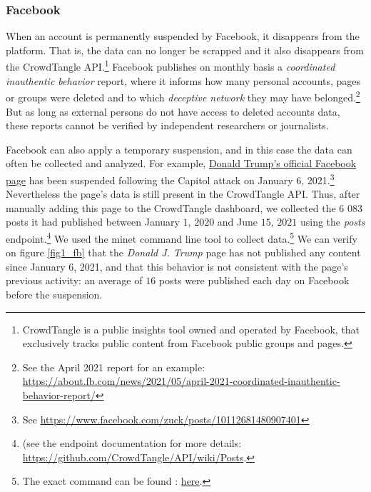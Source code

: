 \documentclass{article}
\begin{document}
\smallskip

\subsubsection{Facebook}

When an account is permanently suspended by Facebook, it disappears from the platform. That is,  the data can no longer be scrapped and it also disappears from the CrowdTangle API.\footnote{CrowdTangle is a public insights tool owned and operated by Facebook, that exclusively tracks public content from Facebook public groups and pages.} Facebook publishes on monthly basis a {\it coordinated inauthentic behavior} report, where it informs how many personal accounts, pages or groups were deleted and to which {\it deceptive network} they may have belonged.\footnote{See the April 2021 report for an example: \href{https://about.fb.com/news/2021/05/april-2021-coordinated-inauthentic-behavior-report/}{https://about.fb.com/news/2021/05/april-2021-coordinated-inauthentic-behavior-report/}} But as long as external persons do not have access to deleted accounts data, these reports cannot be verified by independent researchers or journalists.

Facebook can also apply a temporary suspension, and in this case the data can often be collected and analyzed. For example, \href{https://www.facebook.com/DonaldTrump/}{Donald Trump’s official Facebook page}  has been suspended following the Capitol attack on January 6, 2021.\footnote{See \href{https://www.facebook.com/zuck/posts/10112681480907401}{https://www.facebook.com/zuck/posts/10112681480907401}} Nevertheless the page’s data is still present in the CrowdTangle API. Thus, after manually adding this page to the CrowdTangle dashboard, we collected the $6$ $083$ posts it had published between January $1$, $2020$ and June $15$, $2021$ using the {\it posts} endpoint.\footnote{ (see the endpoint documentation for more details: \href{https://github.com/CrowdTangle/API/wiki/Posts}{https://github.com/CrowdTangle/API/wiki/Posts}.} We used the minet command line tool \cite{minet} to collect data.\footnote{The exact command can be found : \href{https://github.com/medialab/truth-and-trust-online-2021/blob/master/code/collect_facebook_crowdtangle_trump_data.sh}{here}.} We can verify on figure \ref{fig1_fb} that the {\it Donald J. Trump} page has not published any content since January $6$, 2021, and that this behavior is not consistent with the page’s previous activity: an average of $16$ posts were published each day on Facebook before the suspension. 
\end{document}

